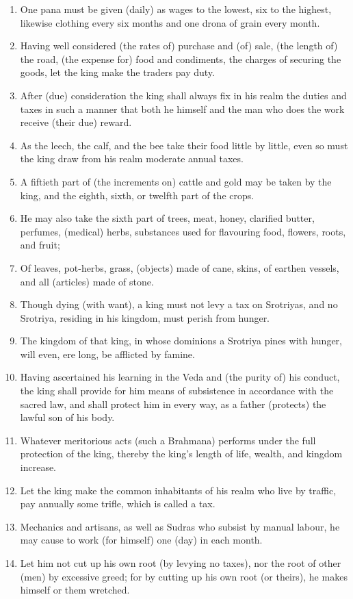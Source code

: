 \begin{enumerate}
\item One pana must be given (daily) as wages to the lowest, six to the highest, likewise clothing every six months and one drona of grain every month.
\item Having well considered (the rates of) purchase and (of) sale, (the length of) the road, (the expense for) food and condiments, the charges of securing the goods, let the king make the traders pay duty.
\item After (due) consideration the king shall always fix in his realm the duties and taxes in such a manner that both he himself and the man who does the work receive (their due) reward.
\item As the leech, the calf, and the bee take their food little by little, even so must the king draw from his realm moderate annual taxes.
\item A fiftieth part of (the increments on) cattle and gold may be taken by the king, and the eighth, sixth, or twelfth part of the crops.
\item He may also take the sixth part of trees, meat, honey, clarified butter, perfumes, (medical) herbs, substances used for flavouring food, flowers, roots, and fruit;
\item Of leaves, pot-herbs, grass, (objects) made of cane, skins, of earthen vessels, and all (articles) made of stone.
\item Though dying (with want), a king must not levy a tax on Srotriyas, and no Srotriya, residing in his kingdom, must perish from hunger.
\item The kingdom of that king, in whose dominions a Srotriya pines with hunger, will even, ere long, be afflicted by famine.
\item Having ascertained his learning in the Veda and (the purity of) his conduct, the king shall provide for him means of subsistence in accordance with the sacred law, and shall protect him in every way, as a father (protects) the lawful son of his body.
\item Whatever meritorious acts (such a Brahmana) performs under the full protection of the king, thereby the king's length of life, wealth, and kingdom increase.
\item Let the king make the common inhabitants of his realm who live by traffic, pay annually some trifle, which is called a tax.
\item Mechanics and artisans, as well as Sudras who subsist by manual labour, he may cause to work (for himself) one (day) in each month.
\item Let him not cut up his own root (by levying no taxes), nor the root of other (men) by excessive greed; for by cutting up his own root (or theirs), he makes himself or them wretched.

\end{enumerate}
